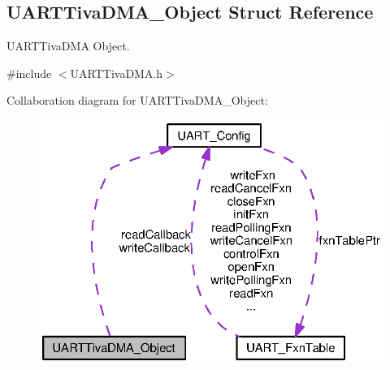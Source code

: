 \subsection{U\+A\+R\+T\+Tiva\+D\+M\+A\+\_\+\+Object Struct Reference}
\label{struct_u_a_r_t_tiva_d_m_a___object}


U\+A\+R\+T\+Tiva\+D\+M\+A Object.  




{\ttfamily \#include $<$U\+A\+R\+T\+Tiva\+D\+M\+A.\+h$>$}



Collaboration diagram for U\+A\+R\+T\+Tiva\+D\+M\+A\+\_\+\+Object\+:
\nopagebreak
\begin{figure}[H]
\begin{center}
\leavevmode
\includegraphics[width=324pt]{struct_u_a_r_t_tiva_d_m_a___object__coll__graph}
\end{center}
\end{figure}

